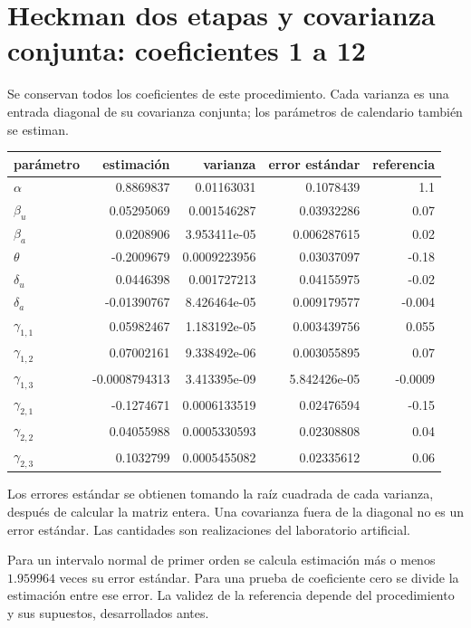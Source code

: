 \documentclass[11pt,a4paper]{article}
\begin{document}
\section{Heckman dos etapas y covarianza conjunta: coeficientes 1 a 12}
Se conservan todos los coeficientes de este procedimiento. Cada varianza es una entrada diagonal de su covarianza conjunta; los parámetros de calendario también se estiman.
\begin{center}\small
\begin{tabular}{lrrrr}
\toprule
parámetro & estimación & varianza & error estándar & referencia\\\midrule
$\alpha$ & 0.8869837 & 0.01163031 & 0.1078439 & 1.1\\
$\beta_u$ & 0.05295069 & 0.001546287 & 0.03932286 & 0.07\\
$\beta_a$ & 0.0208906 & 3.953411e-05 & 0.006287615 & 0.02\\
$\theta$ & -0.2009679 & 0.0009223956 & 0.03037097 & -0.18\\
$\delta_u$ & 0.0446398 & 0.001727213 & 0.04155975 & -0.02\\
$\delta_a$ & -0.01390767 & 8.426464e-05 & 0.009179577 & -0.004\\
$\gamma_{1,1}$ & 0.05982467 & 1.183192e-05 & 0.003439756 & 0.055\\
$\gamma_{1,2}$ & 0.07002161 & 9.338492e-06 & 0.003055895 & 0.07\\
$\gamma_{1,3}$ & -0.0008794313 & 3.413395e-09 & 5.842426e-05 & -0.0009\\
$\gamma_{2,1}$ & -0.1274671 & 0.0006133519 & 0.02476594 & -0.15\\
$\gamma_{2,2}$ & 0.04055988 & 0.0005330593 & 0.02308808 & 0.04\\
$\gamma_{2,3}$ & 0.1032799 & 0.0005455082 & 0.02335612 & 0.06\\
\bottomrule
\end{tabular}\end{center}

Los errores estándar se obtienen tomando la raíz cuadrada de cada varianza, después de calcular la matriz entera. Una covarianza fuera de la diagonal no es un error estándar. Las cantidades son realizaciones del laboratorio artificial.

Para un intervalo normal de primer orden se calcula estimación más o menos $1.959964$ veces su error estándar. Para una prueba de coeficiente cero se divide la estimación entre ese error. La validez de la referencia depende del procedimiento y sus supuestos, desarrollados antes.
\end{document}
